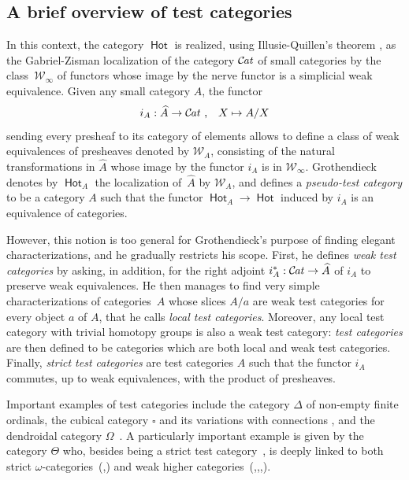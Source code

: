 \documentclass[10pt, english, a4paper, nothms]{amsart}
\theoremstyle{plain}
\theoremstyle{remark}
\theoremstyle{definition}
\numberwithin{equation}{theorem}
\newcommand{\Cat}{{\mathcal{C}\mspace{-2.mu}\it{at}}}
\newcommand{\pref}[1]{{\widehat{ #1 }}}
\newcommand{\tranche}[2]{#1/{#2}}
\newcommand{\W}{\mathcal{W}}
\newcommand{\Hot}{\operatorname{\mathsf{Hot}}}
\newcommand{\cub}{\square}
\newcommand{\mdvirg}{\text{ ,}\hspace{10pt}}
\begin{document}
\subsection*{A brief overview of test categories}
In this context, the category $\Hot$ is realized, using Illusie-Quillen's
theorem \cite{illusie1971cotangent}, as the Gabriel-Zisman localization of the
category $\Cat$ of small categories by the class~$\W_\infty$ of functors whose
image by the nerve functor is a simplicial weak equivalence. Given any small
category $A$, the functor
\[
  i_A : \pref{A} \to \Cat \mdvirg X \mapsto \tranche{A}{X}
\]
sending every presheaf to its category of elements allows to define a class of
weak equivalences of presheaves denoted by $\W_A$, consisting of the natural
transformations in $\pref{A}$ whose image by the functor $i_A$ is in
$\W_\infty$. Grothendieck denotes by $\Hot_A$ the localization of~$\pref{A}$ by
$\W_A$, and defines a \emph{pseudo-test category} to be a category $A$ such that
the functor $\Hot_A \to \Hot$ induced by $i_A$ is an equivalence of categories.

However, this notion is too general for Grothendieck's purpose of finding
elegant characterizations, and he gradually restricts his scope. First, he
defines \emph{weak test categories} by asking, in addition, for the right
adjoint $i_A^* : \Cat \to \pref{A}$ of $i_A$ to preserve weak equivalences. 
He then manages to find very simple characterizations of categories~$A$ whose
slices $\tranche{A}{a}$ are weak test categories for every object $a$ of $A$,
that he calls \emph{local test categories}. Moreover, any local test category
with trivial homotopy groups is also a weak test category: \emph{test
categories} are then defined to be categories which are both local and weak test
categories. Finally, \emph{strict test categories} are test categories $A$ such
that the functor $i_A$ commutes, up to weak equivalences, with the product of
presheaves.

Important examples of test categories include the category $\Delta$ of non-empty
finite ordinals, the cubical category $\cub$ and its variations with connections
\cite{maltsiniotis2009cubique}, and the dendroidal category
$\Omega$~\cite{ara2019DendroidalTest}. A particularly important example is given
by the category $\Theta$ who, besides being a strict test
category~\cite{cisinski2011theta}, is deeply linked to both strict
$\omega$-categories~(\cite{makkai2001duality},\cite{berger2002cellular}) and
weak higher
categories~(\cite{joyal1997disks},\cite{batanin1998monoidal},\cite{rezk2010weak},\cite{ara2014quasi}).
\end{document}
